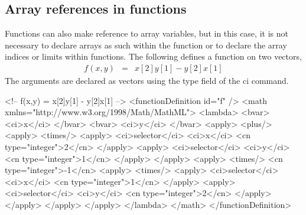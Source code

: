 \subsection{Array references in functions}

Functions can also make reference to array variables, but in this case, it is not necessary to declare arrays as such within the function or to declare the array indices or limits within functions.  The following defines a function on two vectors, 
\begin{eqnarray*}
f(x,y) & = & x[2]y[1] - y[2]x[1]
\end{eqnarray*}
The arguments are declared as vectors using the type field of the ci command.

\begin{example}
<!-- f(x,y) = x[2]y[1] - y[2]x[1] -->
<functionDefinition id="f" />
 <math xmlns="http://www.w3.org/1998/Math/MathML">
  <lambda>
   <bvar>
    <ci>x</ci>
   </bvar>
   <bvar>
    <ci>y</ci>
   </bvar>
   <apply>
    <plus/>
    <apply>
     <times/>
     <apply>
      <ci>selector</ci>
      <ci>x</ci>
      <cn type="integer">2</cn>
     </apply>
     <apply>
      <ci>selector</ci>
      <ci>y</ci>
      <cn type="integer">1</cn>
     </apply>
    </apply>
    <apply>
     <times/>
     <cn type="integer">-1</cn>
     <apply>
      <times/>
      <apply>
       <ci>selector</ci>
       <ci>x</ci>
       <cn type="integer">1</cn>
      </apply>
      <apply>
       <ci>selector</ci>
       <ci>y</ci>
       <cn type="integer">2</cn>
      </apply>
     </apply>
    </apply>
   </apply>
  </lambda>
 </math>
</functionDefinition>
\end{example}

